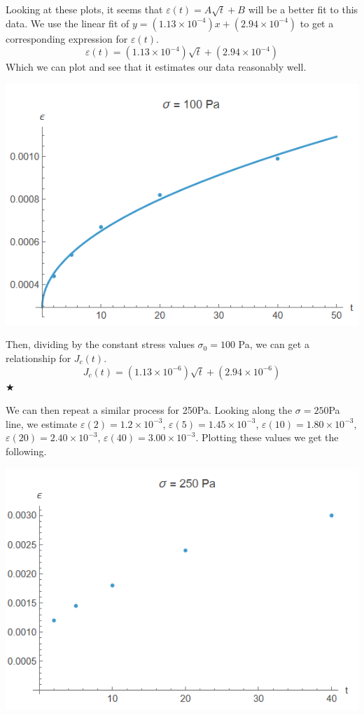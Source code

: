 \documentclass[preprint,12pt,authoryear]{elsarticle}
\begin{document}
Looking at these plots, it seems that $\varepsilon(t) = A\sqrt{t}+B$ will be a better fit to this data. We use the linear fit of $y = (1.13 \times10^{-4})x + (2.94 \times 10^{-4})$ to get a corresponding expression for $\varepsilon(t)$. 
\begin{equation}
    \varepsilon(t) =(1.13 \times10^{-4})\sqrt{t}+(2.94 \times 10^{-4})
\end{equation}
Which we can plot and see that it estimates our data reasonably well.

\includegraphics[scale=0.5]{Dawson-figures/100-full.png}

Then, dividing by the constant stress values $\sigma_0 = 100$ Pa, we can get a relationship for $J_c(t)$.
\begin{equation}
    J_c(t) =(1.13 \times10^{-6})\sqrt{t}+(2.94 \times 10^{-6})
\end{equation}
\hspace*{\fill} $\bigstar$
\medskip

We can then repeat a similar process for 250Pa. Looking along the $\sigma = 250$Pa line, we estimate $\varepsilon(2) = 1.2 \times 10^{-3}$, $\varepsilon(5) = 1.45 \times 10^{-3}$, $\varepsilon(10) = 1.80 \times 10^{-3}$, $\varepsilon(20) = 2.40 \times 10^{-3}$, $\varepsilon(40) = 3.00 \times 10^{-3}$. Plotting these values we get the following.

\includegraphics[scale=0.5]{Dawson-figures/250-data.png}
\end{document}
